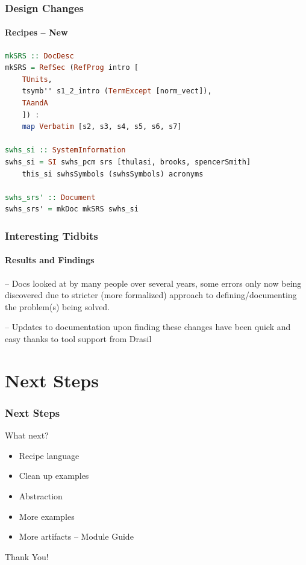 \documentclass{beamer}
\begin{document}

\begin{frame}[fragile]

\frametitle{Design Changes}
\framesubtitle{Recipes -- New}

\begin{lstlisting}[language=Haskell, frame=single, showstringspaces=false, basicstyle=\scriptsize]
mkSRS :: DocDesc
mkSRS = RefSec (RefProg intro [
	TUnits, 
	tsymb'' s1_2_intro (TermExcept [norm_vect]),
	TAandA
	]) : 
	map Verbatim [s2, s3, s4, s5, s6, s7]

swhs_si :: SystemInformation
swhs_si = SI swhs_pcm srs [thulasi, brooks, spencerSmith] 
	this_si swhsSymbols (swhsSymbols) acronyms 

swhs_srs' :: Document
swhs_srs' = mkDoc mkSRS swhs_si
\end{lstlisting} 
\end{frame}


\begin{frame}

\frametitle{Interesting Tidbits} %
\framesubtitle{Results and Findings}

-- Docs looked at by many people over several years, some errors only now being
discovered due to stricter (more formalized) approach to defining/documenting
the problem(s) being solved.

-- Updates to documentation upon finding these changes have been quick and easy
thanks to tool support from Drasil
\end{frame}


\section[Next Steps]{Next Steps}


\begin{frame}

\frametitle{Next Steps}


\begin{Large}
What next?
\end{Large}

\begin{itemize}
\item Recipe language %
\item Clean up examples
\item Abstraction
\item More examples
\item More artifacts -- Module Guide
\end{itemize}
\end{frame}


\begin{frame}
\begin{center}
\Huge Thank You!
\end{center}
\end{frame}

\end{document}

